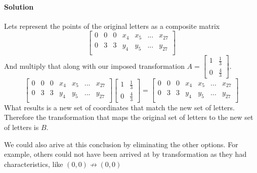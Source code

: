 \documentclass{article}
\begin{document}
    \paragraph{Solution}
        Lets represent the points of the original letters as a composite matrix
        \[
            \begin{bmatrix}
                0&0&0&x_4&x_5&...&x_{27}\\
                0&3&3&y_4&y_5&...&y_{27}\\
            \end{bmatrix}
        \]
        And multiply that along with our imposed transformation $A=\begin{bmatrix}1&\frac{1}{3}\\0&\frac{4}{3}\end{bmatrix}$.
        \[
            \begin{bmatrix}
                0&0&0&x_4&x_5&...&x_{27}\\
                0&3&3&y_4&y_5&...&y_{27}\\
            \end{bmatrix}
            \begin{bmatrix}1&\frac{1}{3}\\0&\frac{4}{3}\end{bmatrix}
            =
            \begin{bmatrix} %
                0&0&0&x_4&x_5&...&x_{27}\\ %
                0&3&3&y_4&y_5&...&y_{27}\\ %
            \end{bmatrix}
        \]
        What results is a new set of coordinates that match the new set of letters.
        Therefore the transformation that maps the original set of letters to the new set of letters is $B$.
        \begin{asidebox}
            We could also arive at this conclusion by eliminating the other options.
            For example, others could not have been arrived at by transformation as they
            had characteristics, like $(0, 0) \not\rightarrow (0, 0)$
        \end{asidebox}
\end{document}
